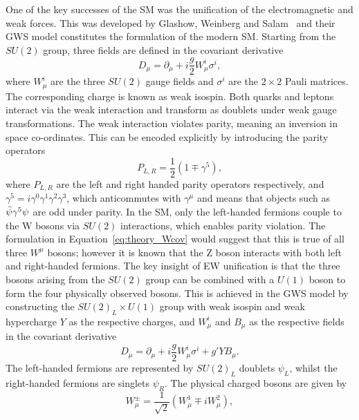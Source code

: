 One of the key successes of the SM was the unification of the electromagnetic and weak forces.
This was developed by Glashow, Weinberg and Salam~\cite{Glashow,Weinberg,Salam} 
and their GWS model constitutes the formulation of the modern SM.
Starting from the $SU(2)$ group, three fields are defined in the covariant derivative
\begin{equation}
\label{eq:theory_Wcov}
D_\mu = \partial_\mu + i \frac{g}{2} W_\mu^i \sigma^i ,
\end{equation}
where $W_\mu^i$ are the three $SU(2)$ gauge fields and $\sigma^i$ are the $2\times2$ Pauli matrices.
The corresponding charge is known as weak isospin. 
Both quarks and leptons interact via the weak interaction 
and transform as doublets under weak gauge transformations.
The weak interaction violates parity, meaning an inversion in space co-ordinates.
This can be encoded explicitly by introducing the parity operators
\begin{equation}
P_{L,R} = \frac{1}{2} (1 \mp \gamma^5) ,
\end{equation}
where $P_{L,R}$ are the left and right handed parity operators respectively, 
and $\gamma^5 = i\gamma^0\gamma^1\gamma^2\gamma^3$, 
which anticommutes with $\gamma^\mu$ and means that objects such as $\bar{\psi} \gamma^5 \psi$
are odd under parity.
In the SM, only the left-handed fermions couple to the W bosons via $SU(2)$ interactions, 
which enables parity violation.
The formulation in Equation~\ref{eq:theory_Wcov} would suggest 
that this is true of all three $W^{\mu}$ bosons;
however it is known that the Z boson interacts with both left and right-handed fermions.
The key insight of EW unification is that the three bosons arising from the $SU(2)$ group 
can be combined with a $U(1)$ boson to form the four physically observed bosons.
This is achieved in the GWS model by constructing the $SU(2)_L \times U(1)$ group 
with weak isospin and weak hypercharge $Y$ as the respective charges, 
and $W^{i}_{\mu}$ and $B_{\mu}$ as the respective fields in the covariant derivative
\begin{equation}
\label{eq:theory_EWcov}
D_\mu = \partial_\mu + i \frac{g}{2} W_\mu^i \sigma^i + g' Y B_\mu .
\end{equation}
The left-handed fermions are represented by $SU(2)_L$ doublets $\psi_L$, 
whilst the right-handed fermions are singlets $\psi_R$.
The physical charged bosons are given by
\begin{equation}
W_\mu^\pm = \frac{1}{\sqrt{2}} (W_\mu^1 \mp iW_\mu^2) ,
\end{equation}

